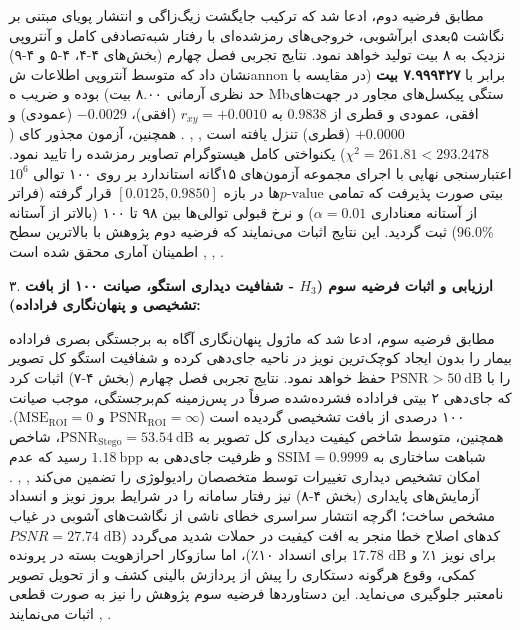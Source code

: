 مطابق فرضیه دوم، ادعا شد که ترکیب جایگشت زیگ‌زاگی و انتشار پویای  مبتنی بر نگاشت ۵بعدی ابرآشوبی، خروجی‌های رمزشده‌ای با رفتار شبه‌تصادفی کامل و آنتروپی نزدیک به ۸ بیت تولید خواهد نمود. نتایج تجربی فصل چهارم (بخش‌های ۴{-}۴، ۴{-}۵ و ۴{-}۹) نشان داد که متوسط آنتروپی اطلاعات شannon برابر با \textbf{۷.۹۹۹۴۲۷ بیت} (در مقایسه با حد نظری آرمانی ۸.۰۰ بیت) بوده و ضریب ه Mbستگی پیکسل‌های مجاور در جهت‌های افقی، عمودی و قطری از $0.9838$ به \textbf{$r_{xy} = +0.0010$} (افقی)، \textbf{$-0.0029$} (عمودی) و \textbf{$+0.0000$} (قطری) تنزل یافته است , , . همچنین، آزمون مجذور کای ($\chi^2 = 261.81 < 293.2478$) یکنواختی کامل هیستوگرام تصاویر رمزشده را تایید نمود. اعتبارسنجی نهایی با اجرای مجموعه آزمون‌های ۱۵گانه استاندارد  بر روی ۱۰۰ توالی $10^6$ بیتی صورت پذیرفت که تمامی $p\text{-value}$ها در بازه $[0.0125,\allowbreak{} 0.9850]$ قرار گرفته (فراتر از آستانه معناداری $\alpha = 0.01$) و نرخ قبولی توالی‌ها بین ۹۸ تا ۱۰۰ (بالاتر از آستانه $96.0\%$) ثبت گردید. این نتایج اثبات می‌نمایند که فرضیه دوم پژوهش با بالاترین سطح اطمینان آماری محقق شده است , , .\par



۳. \textbf{ارزیابی و اثبات فرضیه سوم ($H_3$ {-} شفافیت دیداری استگو، صیانت ۱۰۰ از بافت تشخیصی  و پنهان‌نگاری فراداده):}\par

مطابق فرضیه سوم، ادعا شد که ماژول پنهان‌نگاری آگاه به برجستگی بصری  فراداده بیمار را بدون ایجاد کوچک‌ترین نویز در ناحیه  جای‌دهی کرده و شفافیت استگو کل تصویر را با $\mathrm{PSNR} > 50\mathrm{\ dB}$ حفظ خواهد نمود. نتایج تجربی فصل چهارم (بخش ۴{-}۷) اثبات کرد که جای‌دهی ۲ بیتی  فراداده فشرده‌شده  صرفاً در پس‌زمینه کم‌برجستگی، موجب صیانت ۱۰۰ درصدی از بافت تشخیصی گردیده است (\textbf{$\mathrm{PSNR}_{\mathrm{ROI}} = \infty$} و $\mathrm{MSE}_{\mathrm{ROI}} = 0$). همچنین، متوسط شاخص کیفیت دیداری کل تصویر به \textbf{$\mathrm{PSNR}_{\mathrm{Stego}} = 53.54\mathrm{\ dB}$}، شاخص شباهت ساختاری به \textbf{$\mathrm{SSIM} = 0.9999$} و ظرفیت جای‌دهی به \textbf{$1.18\mathrm{\ bpp}$} رسید که عدم امکان تشخیص دیداری تغییرات توسط متخصصان رادیولوژی را تضمین می‌کند , , . آزمایش‌های پایداری (بخش ۴{-}۸) نیز رفتار سامانه را در شرایط بروز نویز و انسداد مشخص ساخت؛ اگرچه انتشار سراسری خطای ناشی از نگاشت‌های آشوبی در غیاب کدهای اصلاح خطا منجر به افت کیفیت در حملات شدید می‌گردد ($PSNR = 27.74\text{ dB}$ برای نویز ۱٪ و $17.78\text{ dB}$ برای انسداد ۱۰٪)، اما سازوکار احرازهویت بسته  در پرونده کمکی، وقوع هرگونه دستکاری را پیش از پردازش بالینی کشف و از تحویل تصویر نامعتبر جلوگیری می‌نماید. این دستاوردها فرضیه سوم پژوهش را نیز به صورت قطعی اثبات می‌نمایند , .\par

